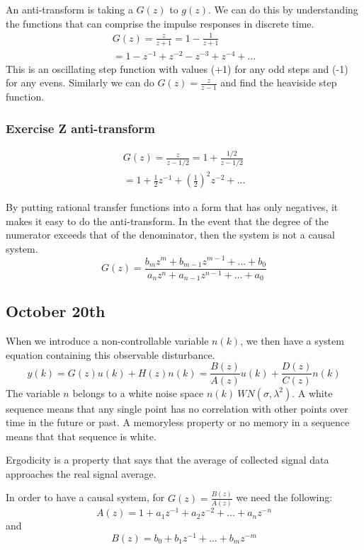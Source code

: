 \documentclass[11pt]{article}
\begin{document}
An anti-transform is taking a $G(z)$ to $g(z)$.
We can do this by understanding the functions that can comprise the impulse responses in discrete time.
\begin{gather}
    G(z) = \frac{z}{z+1} = 1 - \frac{1}{z+1} \\
    = 1 - z^{-1} + z^{-2} - z^{-3} + z^{-4} + \dots
\end{gather}
This is an oscillating step function with values (+1) for any odd steps and (-1) for any evens.
Similarly we can do $G(z) = \frac{z}{z-1}$ and find the heaviside step function.

\subsubsection{Exercise Z anti-transform}
\begin{gather}
    G(z) = \frac{z}{z-1/2} = 1 + \frac{1/2}{z-1/2} \\
    = 1 + \frac{1}{2} z^{-1} + (\frac{1}{2})^2 z^{-2} + \dots
\end{gather}

By putting rational transfer functions into a form that has only negatives, it makes it easy to do the anti-transform.
In the event that the degree of the numerator exceeds that of the denominator, then the system is not a causal system.
\begin{equation}
    G(z) = \frac{b_m z^m + b_{m-1} z^{m-1} + \dots + b_0}{a_n z^{n} + a_{n-1} z^{n-1} + \dots + a_0}
\end{equation}

\subsection{October 20th}
When we introduce a non-controllable variable $n(k)$, we then have a system equation containing this observable disturbance.
\begin{equation}
    y(k) = G(z) u(k) + H(z) n(k) = \frac{B(z)}{A(z)} u(k) + \frac{D(z)}{C(z)} n(k)
\end{equation}
The variable $n$ belongs to a white noise space $n(k) ~ WN(\sigma, \lambda^2)$.
A white sequence means that any single point has no correlation with other points over time in the future or past.
A memoryless property or no memory in a sequence means that that sequence is white.

Ergodicity is a property that says that the average of collected signal data approaches the real signal average.

In order to have a causal system, for $G(z)= \frac{B(z)}{A(z)}$ we need the following:
\begin{equation}
    A(z) = 1 + a_1 z^{-1} + a_2 z^{-2} + \dots + a_n z^{-n}
\end{equation}
and
\begin{equation}
    B(z) = b_0 + b_1 z^{-1} + \dots + b_m z^{-m}
\end{equation}
\end{document}
